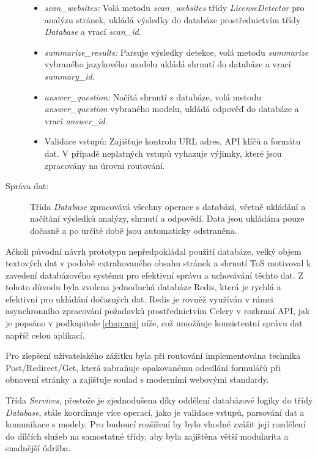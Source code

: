 \begin{description}
      \begin{itemize}
        \item \textit{scan_websites:} Volá metodu \textit{scan\_websites} třídy \textit{LicenseDetector} pro analýzu stránek, 
          ukládá výsledky do databáze prostřednictvím třídy \textit{Database} a vrací \textit{scan\_id}.
        \item \textit{summarize_results:} Parsuje výsledky detekce, volá metodu \textit{summarize} vybraného jazykového modelu 
          ukládá shrnutí do databáze a vrací \textit{summary\_id}.
        \item \textit{answer_question:} Načítá shrnutí z databáze, volá metodu \textit{answer\_question} vybraného modelu, 
          ukládá odpověď do databáze a vrací \textit{answer\_id}.
        \item Validace vstupů: Zajišťuje kontrolu URL adres, API klíčů a formátu dat. V případě neplatných vstupů vyhazuje výjimky, které jsou 
          zpracovány na úrovni routování.
      \end{itemize}
    
    \item[Správa dat:] 
      Třída \textit{Database} zpracovává všechny operace s databází, včetně ukládání a načítání výsledků analýzy, shrnutí a odpovědí.
      Data jsou ukládána pouze dočasně a po určité době jsou automaticky odstraněna.
  \end{description}
  
Ačkoli původní návrh prototypu nepředpokládal použití databáze, velký objem textových dat v podobě extrahovaného obsahu stránek a shrnutí ToS motivoval k zavedení databázového systému pro efektivní správu a uchovávání těchto dat. 
Z tohoto důvodu byla zvolena jednoduchá databáze Redis, která je rychlá a efektivní pro ukládání dočasných dat.
Redis je rovněž využíván v rámci asynchronního zpracování požadavků prostřednictvím Celery v rozhraní API, jak je popsáno v podkapitole \ref{chap:api} níže, což umožňuje konzistentní správu dat napříč celou aplikací.

Pro zlepšení uživatelského zážitku byla při routování implementována technika Post/Redirect/Get, která zabraňuje opakovanému odesílání formulářů při obnovení stránky a zajišťuje soulad s moderními webovými standardy.

Třída \textit{Services}, přestože je zjednodušena díky oddělení databázové logiky do třídy \textit{Database}, stále koordinuje více operací, jako je validace vstupů, parsování dat a komunikace s modely.
Pro budoucí rozšíření by bylo vhodné zvážit její rozdělení do dílčích služeb na samostatné třídy, aby byla zajištěna větší modularita a snadnější údržba.

